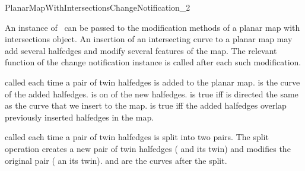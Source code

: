 
\ccRefPageBegin

\begin{ccRefConcept}{PlanarMapWithIntersectionsChangeNotification_2}

\ccDefinition
   An instance of \ccRefName\ can be passed to the modification
   methods of a planar map with intersections object. An insertion
   of an intersecting curve to a planar map may add several
   halfedges and modify several features of the map. The relevant
   function of the change notification instance is called after
   each such modification.

\ccTypes
{}

\ccOperations


  {called each time a pair of twin halfedges is added to the planar map.
   is the curve of the added halfedges.
   is on of the new halfedges.
   is true iff  is directed the same as the curve that we insert to the map.
   is true iff the added halfedges overlap previously inserted halfedges in the map.}

  {called each time a pair of twin halfedges is split into two
  pairs. The split operation creates a new pair of twin halfedges
  ( and its twin) and modifies the original
  pair ( an its twin).
   and  are the curves after the split.
  }


\end{ccRefConcept}
